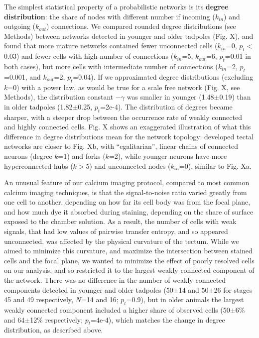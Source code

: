 \documentclass{article}
\begin{document}
The simplest statistical property of a probabilistic networks is its \textbf{degree distribution}: the share of nodes with different number if incoming ($k_{in}$) and outgoing ($k_{out}$) connections. We compared rounded degree distributions (see Methods) between networks detected in younger and older tadpoles (Fig. X), and found that more mature networks contained fewer unconnected cells ($k_{in}$=0, $p_t<$0.03) and fewer cells with high number of connections ($k_{in}$=5, $k_{out}$=6, $p_t$=0.01 in both cases), but more cells with intermediate number of connections ($k_{in}$=2, $p_t$=0.001, and $k_{out}$=2, $p_t$=0.04). If we approximated degree distributions (excluding $k$=0) with a power law, as would be true for a scale free network (Fig. X, see Methods), the distribution constant $-\gamma$ was smaller in younger (1.48$\pm$0.19) than in older tadpoles (1.82$\pm$0.25, $p_t$=2e-4). The distribution of degrees became sharper, with a steeper drop between the occurrence rate of weakly connected and highly connected cells. Fig. X shows an exaggerated illustration of what this difference in degree distributions mean for the network topology: developed tectal networks are closer to Fig. Xb, with “egalitarian”, linear chains of connected neurons (degree $k$=1) and forks ($k$=2), while younger neurons have more hyperconnected hubs ($k>$5) and unconnected nodes ($k_{in}$=0), similar to Fig. Xa.

An unusual feature of our calcium imaging protocol, compared to most common calcium imaging techniques, is that the signal-to-noise ratio varied greatly from one cell to another, depending on how far its cell body was from the focal plane, and how much dye it absorbed during staining, depending on the share of surface exposed to the chamber solution. As a result, the number of cells with weak signals, that had low values of pairwise transfer entropy, and so appeared unconnected, was affected by the physical curvature of the tectum. While we aimed to minimize this curvature, and maximize the intersection between stained cells and the focal plane, we wanted to minimize the effect of poorly resolved cells on our analysis, and so restricted it to the largest weakly connected component of the network. There was no difference in the number of weakly connected components detected in younger and older tadpoles (50$\pm$14 and 50$\pm$26 for stages 45 and 49 respectively, $N$=14 and 16; $p_t$=0.9), but in older animals the largest weakly connected component included a higher share of observed cells (50$\pm$6\% and 64$\pm$12\% respectively; $p_t$=4e-4), which matches the change in degree distribution, as described above.
\end{document}
